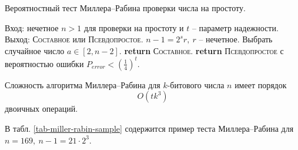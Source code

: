 \begin{algorithm}[iht]
    \caption{Вероятностный тест Миллера--Рабина проверки числа на простоту.\label{miller-rabin}}
    \begin{algorithmic}
        \STATE Вход: нечетное $n>1$ для проверки на простоту и $t$ -- параметр надежности.
        \STATE Выход: \textsc{Составное} или \textsc{Псевдопростое}.
        \STATE $n - 1 = 2^s r, ~ r$ -- нечетное.
            \STATE Выбрать случайное число $a \in [2, n-2]$.
               \STATE \textbf{return} \textsc{Составное}.
           \ENDIF
        \ENDFOR
       \STATE \textbf{return} \textsc{Псевдопростое} с вероятностью ошибки $P_{error} < \left( \frac{1}{4} \right)^t$.
    \end{algorithmic}
\end{algorithm}

Сложность алгоритма Миллера--Рабина для $k$-битового числа $n$ имеет порядок
    \[ O(t k^3) \]
двоичных операций.

\example
В табл. \ref{tab-miller-rabin-sample} содержится пример теста Миллера--Рабина для $n = 169, ~ n-1 = 21 \cdot 2^3$.
\begin{table}[!ht]
    \centering
    \caption{Пример теста Миллера--Рабина для $n = 169$ и четырех оснований $a$: 19, 22, 23, 2\label{tab-miller-rabin-sample}}
\end{table}
\exampleend


